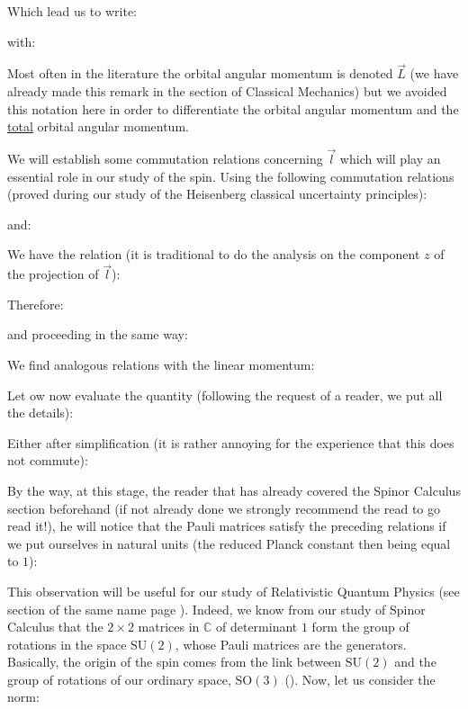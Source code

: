 	Which lead us to write:
	
	with:
	
	\begin{tcolorbox}[title=Remark,colframe=black,arc=10pt]
	Most often in the literature the orbital angular momentum is denoted $\vec{L}$ (we have already made this remark in the section of Classical Mechanics) but we avoided this notation here in order to differentiate the orbital angular momentum and the \underline{total} orbital angular momentum.
	\end{tcolorbox}
	We will establish some commutation relations concerning $\vec{l}$ which will play an essential role in our study of the spin. Using the following commutation relations (proved during our study of the Heisenberg classical uncertainty principles):
	
	and:
	
	We have the relation (it is traditional to do the analysis on the component $z$ of the projection of $\vec{l}$):
	
	Therefore:
	
	and proceeding in the same way:
	
	\begin{tcolorbox}[title=Remark,colframe=black,arc=10pt]
	We find analogous relations with the linear momentum:
	
	\end{tcolorbox}
	Let ow now evaluate the quantity (following the request of a reader, we put all the details):
	
	Either after simplification (it is rather annoying for the experience that this does not commute):
	
	By the way, at this stage, the reader that has already covered the Spinor Calculus section beforehand (if not already done we strongly recommend the read to go read it!), he will notice that the Pauli matrices satisfy the preceding relations if we put ourselves in natural units (the reduced Planck constant then being equal to $1$):
	
	This observation will be useful for our study of Relativistic Quantum Physics (see section of the same name page \pageref{relativistic quantum physics}). Indeed, we know from our study of Spinor Calculus that the $2\times 2$ matrices in $\mathbb{C}$ of determinant $1$ form the group of rotations in the space $\text{SU}(2)$, whose Pauli matrices are the generators. Basically, the origin of the spin comes from the link between $\text{SU}(2)$ and the group of rotations of our ordinary space, $\text{SO}(3)$ ().
	Now, let us consider the norm:
	

